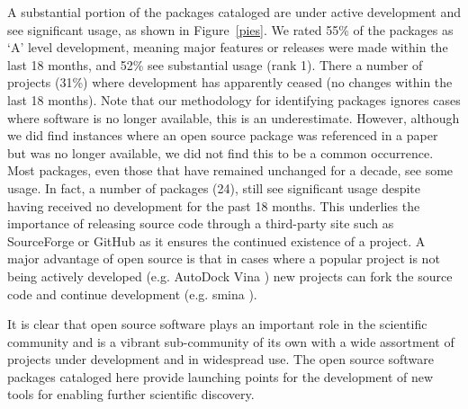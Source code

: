 A substantial portion of the packages cataloged are under active development and see significant usage, as shown in Figure~\ref{pies}.  We rated 55\% of the packages as `A' level development, meaning major features or releases were made within the last 18 months, and 52\% see substantial usage (rank 1).  
There a number of projects (31\%) where development has apparently ceased (no changes within the last 18 months). Note that our methodology for identifying packages 
ignores cases where software is no longer available, this is an underestimate.
 However, although we did find instances where an open source package was referenced in a paper but was no longer available, we did not find this to be a common occurrence.  Most packages, even those that have remained unchanged for a decade, see some usage.  In fact, a number of packages (24), still see significant usage despite having received no development for the past 18 months.  This underlies the importance of releasing source code through a third-party site such as SourceForge or GitHub as it ensures the continued existence of a project.  A major advantage of open source is that in cases where a popular project is not being actively developed (e.g. AutoDock Vina \cite{Trott_2009}) new projects can fork the source code and continue development (e.g. smina \cite{Koes_2013}).

It is clear that open source software plays an important role in the scientific community and is a vibrant sub-community of its own with a wide assortment of projects under development and in widespread use.  The open source software packages cataloged here provide launching points for the development of new tools for enabling further scientific discovery.
